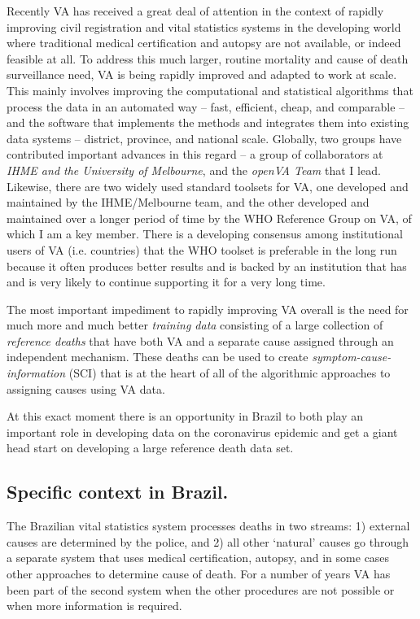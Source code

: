 \documentclass[12pt]{article}
\begin{document}
Recently VA has received a great deal of attention in the context of rapidly improving civil registration and vital statistics systems in the developing world where traditional medical certification and autopsy are not available, or indeed feasible at all.  To address this much larger, routine mortality and cause of death surveillance need, VA is being rapidly improved and adapted to work at scale.  This mainly involves improving the computational and statistical algorithms that process the data in an automated way -- fast, efficient, cheap, and comparable -- and the software that implements the methods and integrates them into existing data systems -- district, province, and national scale. Globally, two groups have contributed important advances in this regard -- a group of collaborators at \textit{IHME and the University of Melbourne}, and the \textit{openVA Team} that I lead.  Likewise, there are two widely used standard toolsets for VA, one developed and maintained by the IHME/Melbourne team, and the other developed and maintained over a longer period of time by the WHO Reference Group on VA, of which I am a key member.  There is a developing consensus among institutional users of VA (i.e. countries) that the WHO toolset is preferable in the long run because it often produces better results and is backed by an institution that has and is very likely to continue supporting it for a very long time.

The most important impediment to rapidly improving VA overall is the need for much more and much better \textit{training data} consisting of a large collection of \textit{reference deaths} that have both VA and a separate cause assigned through an independent mechanism.  These deaths can be used to create \textit{symptom-cause-information} (SCI) that is at the heart of all of the algorithmic approaches to assigning causes using VA data.

At this exact moment there is an opportunity in Brazil to both play an important role in developing data on the coronavirus epidemic and get a giant head start on developing a large reference death data set.


\subsection{Specific context in Brazil.}

The Brazilian vital statistics system processes deaths in two streams: 1) external causes are determined by the police, and 2) all other `natural' causes go through a separate system that uses medical certification, autopsy, and in some cases other approaches to determine cause of death.  For a number of years VA has been part of the second system when the other procedures are not possible or when more information is required.
\end{document}
